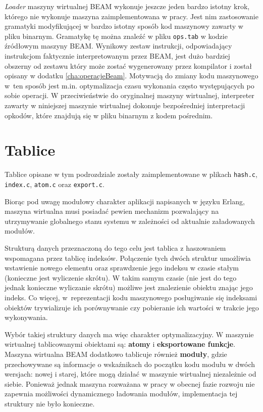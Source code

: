 \emph{Loader} maszyny wirtualnej BEAM wykonuje jeszcze jeden bardzo istotny krok, którego nie wykonuje maszyna zaimplementowana w pracy. Jest nim zastosowanie gramatyki modyfikującej w bardzo istotny sposób kod maszynowy zawarty w pliku binarnym. Gramatykę tę można znaleźć w pliku \texttt{ops.tab} w kodzie źródłowym maszyny BEAM. Wynikowy zestaw instrukcji, odpowiadający instrukcjom faktycznie interpretowanym przez BEAM, jest dużo bardziej obszerny od zestawu który może zostać wygenerowany przez kompilator i został opisany w dodatku \ref{cha:operacjeBeam}. Motywacją do zmiany kodu maszynowego w~ten sposób jest m.in. optymalizacja czasu wykonania często występujących po sobie operacji. W przeciwieństwie do oryginalnej maszyny wirtualnej, interpreter zawarty w niniejszej maszynie wirtualnej dokonuje bezpośredniej interpretacji opkodów, które znajdują się w pliku binarnym z kodem pośrednim.

\section{Tablice}
\label{sec:maszynaTablice}

Tablice opisane w tym podrozdziale zostały zaimplementowane w plikach \texttt{hash.c}, \texttt{index.c}, \texttt{atom.c} oraz \texttt{export.c}.

Biorąc pod uwagę modułowy charakter aplikacji napisanych w języku Erlang, maszyna wirtualna musi posiadać pewien mechanizm pozwalający na utrzymywanie globalnego stanu systemu w zależności od aktualnie załadowanych modułów.

Strukturą danych przeznaczoną do tego celu jest tablica z haszowaniem wspomagana przez tablicę indeksów. Połączenie tych dwóch struktur umożliwia wstawienie nowego elementu oraz sprawdzenie jego indeksu w czasie stałym (konieczne jest wyliczenie skrótu). W takim samym czasie (nie jest do tego jednak konieczne wyliczanie skrótu) możliwe jest znalezienie obiektu znając jego indeks. Co więcej, w~reprezentacji kodu maszynowego posługiwanie się indeksami obiektów trywializuje ich porównywanie czy pobieranie ich wartości w trakcie jego wykonywania.

Wybór takiej struktury danych ma więc charakter optymalizacyjny. W maszynie wirtualnej tablicowanymi obiektami są: \textbf{atomy} i \textbf{eksportowane funkcje}. Maszyna wirtualna BEAM dodatkowo tablicuje również \textbf{moduły}, gdzie przechowywane są informacje o wskaźnikach do początku kodu modułu w dwóch wersjach: nowej i starej, które mogą działać w maszynie wirtualnej niezależnie od siebie. Ponieważ jednak maszyna rozważana w pracy w obecnej fazie rozwoju nie zapewnia możliwości dynamicznego ładowania modułów, implementacja tej struktury nie było konieczne.

